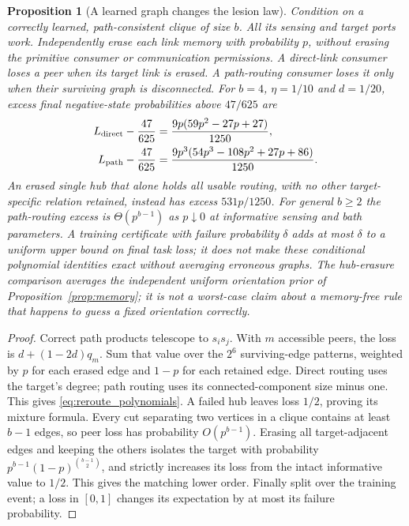 \documentclass[11pt]{article}
\newtheorem{proposition}[theorem]{Proposition}
\theoremstyle{definition}
\theoremstyle{remark}
\begin{document}
\begin{proposition}[A learned graph changes the lesion law]
\label{prop:reroute}
Condition on a correctly learned, path-consistent clique of size $b$.
All its sensing and target ports work. Independently erase each link
memory with probability $p$, without erasing the primitive consumer
or communication permissions. A direct-link consumer loses a peer
when its target link is erased. A path-routing consumer loses it only
when their surviving graph is disconnected. For $b=4$, $\eta=1/10$
and $d=1/20$, excess final negative-state probabilities above
$47/625$ are
\begin{align}
 L_{\rm direct}-\frac{47}{625}
 &=\frac{9p(59p^2-27p+27)}{1250},\notag\\
 L_{\rm path}-\frac{47}{625}
 &=\frac{9p^3(54p^3-108p^2+27p+86)}{1250}.
 \label{eq:reroute_polynomials}
\end{align}
An erased single hub that alone holds all usable routing, with no
other target-specific relation retained, instead has excess
$531p/1250$. For general $b\ge2$ the path-routing excess is
$\Theta(p^{b-1})$ as $p\downarrow0$ at informative sensing and bath
parameters. A training certificate with failure probability $\delta$
adds at most $\delta$ to a uniform upper bound on final task loss;
it does not make these conditional polynomial identities exact
without averaging erroneous graphs. The hub-erasure comparison
averages the independent uniform orientation prior of
Proposition~\ref{prop:memory}; it is not a worst-case claim about
a memory-free rule that happens to guess a fixed orientation correctly.
\end{proposition}
\begin{proof}
Correct path products telescope to $s_is_j$. With $m$ accessible
peers, the loss is $d+(1-2d)q_m$. Sum that value over the $2^6$
surviving-edge patterns, weighted by $p$ for each erased edge and
$1-p$ for each retained edge. Direct routing uses the target's
degree; path routing uses its connected-component size minus one.
This gives \eqref{eq:reroute_polynomials}. A failed hub leaves
loss $1/2$, proving its mixture formula. Every cut separating two
vertices in a clique contains at least $b-1$ edges, so peer loss
has probability $O(p^{b-1})$. Erasing all target-adjacent edges
and keeping the others isolates the target with probability
$p^{b-1}(1-p)^{\binom{b-1}{2}}$, and strictly increases its loss
from the intact informative value to $1/2$. This gives the matching
lower order. Finally split over the training event; a loss in
$[0,1]$ changes its expectation by at most its failure probability.
\end{proof}
\end{document}
